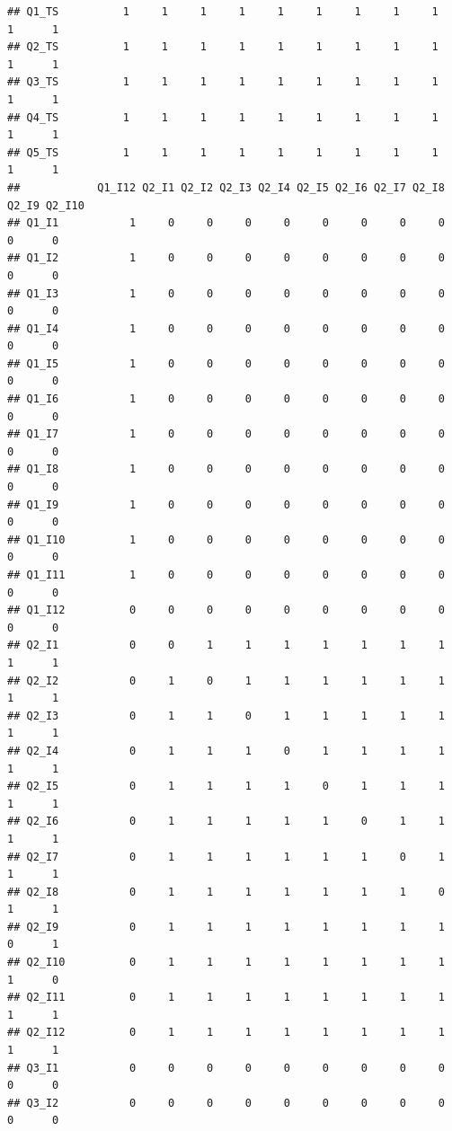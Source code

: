 \documentclass[
]{book}
\begin{document}
\begin{verbatim}
## Q1_TS          1     1     1     1     1     1     1     1     1      1      1
## Q2_TS          1     1     1     1     1     1     1     1     1      1      1
## Q3_TS          1     1     1     1     1     1     1     1     1      1      1
## Q4_TS          1     1     1     1     1     1     1     1     1      1      1
## Q5_TS          1     1     1     1     1     1     1     1     1      1      1
##            Q1_I12 Q2_I1 Q2_I2 Q2_I3 Q2_I4 Q2_I5 Q2_I6 Q2_I7 Q2_I8 Q2_I9 Q2_I10
## Q1_I1           1     0     0     0     0     0     0     0     0     0      0
## Q1_I2           1     0     0     0     0     0     0     0     0     0      0
## Q1_I3           1     0     0     0     0     0     0     0     0     0      0
## Q1_I4           1     0     0     0     0     0     0     0     0     0      0
## Q1_I5           1     0     0     0     0     0     0     0     0     0      0
## Q1_I6           1     0     0     0     0     0     0     0     0     0      0
## Q1_I7           1     0     0     0     0     0     0     0     0     0      0
## Q1_I8           1     0     0     0     0     0     0     0     0     0      0
## Q1_I9           1     0     0     0     0     0     0     0     0     0      0
## Q1_I10          1     0     0     0     0     0     0     0     0     0      0
## Q1_I11          1     0     0     0     0     0     0     0     0     0      0
## Q1_I12          0     0     0     0     0     0     0     0     0     0      0
## Q2_I1           0     0     1     1     1     1     1     1     1     1      1
## Q2_I2           0     1     0     1     1     1     1     1     1     1      1
## Q2_I3           0     1     1     0     1     1     1     1     1     1      1
## Q2_I4           0     1     1     1     0     1     1     1     1     1      1
## Q2_I5           0     1     1     1     1     0     1     1     1     1      1
## Q2_I6           0     1     1     1     1     1     0     1     1     1      1
## Q2_I7           0     1     1     1     1     1     1     0     1     1      1
## Q2_I8           0     1     1     1     1     1     1     1     0     1      1
## Q2_I9           0     1     1     1     1     1     1     1     1     0      1
## Q2_I10          0     1     1     1     1     1     1     1     1     1      0
## Q2_I11          0     1     1     1     1     1     1     1     1     1      1
## Q2_I12          0     1     1     1     1     1     1     1     1     1      1
## Q3_I1           0     0     0     0     0     0     0     0     0     0      0
## Q3_I2           0     0     0     0     0     0     0     0     0     0      0

\end{verbatim}
\end{document}
